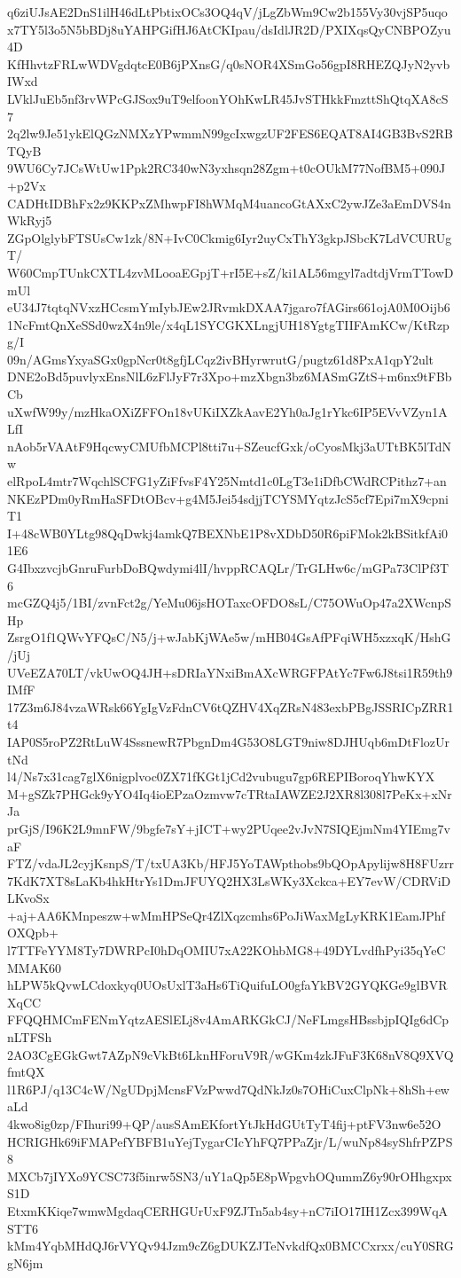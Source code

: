q6ziUJsAE2DnS1ilH46dLtPbtixOCs3OQ4qV/jLgZbWm9Cw2b155Vy30vjSP5uqo
x7TY5l3o5N5bBDj8uYAHPGifHJ6AtCKIpau/dsIdlJR2D/PXIXqsQyCNBPOZyu4D
KfHhvtzFRLwWDVgdqtcE0B6jPXnsG/q0sNOR4XSmGo56gpI8RHEZQJyN2yvbIWxd
LVklJuEb5nf3rvWPcGJSox9uT9elfoonYOhKwLR45JvSTHkkFmzttShQtqXA8cS7
2q2lw9Je51ykElQGzNMXzYPwmmN99gcIxwgzUF2FES6EQAT8AI4GB3BvS2RBTQyB
9WU6Cy7JCsWtUw1Ppk2RC340wN3yxhsqn28Zgm+t0cOUkM77NofBM5+090J+p2Vx
CADHtIDBhFx2z9KKPxZMhwpFI8hWMqM4uancoGtAXxC2ywJZe3aEmDVS4nWkRyj5
ZGpOlglybFTSUsCw1zk/8N+IvC0Ckmig6Iyr2uyCxThY3gkpJSbcK7LdVCURUgT/
W60CmpTUnkCXTL4zvMLooaEGpjT+rI5E+sZ/ki1AL56mgyl7adtdjVrmTTowDmUl
eU34J7tqtqNVxzHCcsmYmIybJEw2JRvmkDXAA7jgaro7fAGirs661ojA0M0Oijb6
1NcFmtQnXeSSd0wzX4n9le/x4qL1SYCGKXLngjUH18YgtgTIIFAmKCw/KtRzpg/I
09n/AGmsYxyaSGx0gpNcr0t8gfjLCqz2ivBHyrwrutG/pugtz61d8PxA1qpY2ult
DNE2oBd5puvlyxEnsNlL6zFlJyF7r3Xpo+mzXbgn3bz6MASmGZtS+m6nx9tFBbCb
uXwfW99y/mzHkaOXiZFFOn18vUKiIXZkAavE2Yh0aJg1rYkc6IP5EVvVZyn1ALfI
nAob5rVAAtF9HqcwyCMUfbMCPl8tti7u+SZeucfGxk/oCyosMkj3aUTtBK5lTdNw
elRpoL4mtr7WqchlSCFG1yZiFfvsF4Y25Nmtd1c0LgT3e1iDfbCWdRCPithz7+an
NKEzPDm0yRmHaSFDtOBcv+g4M5Jei54sdjjTCYSMYqtzJcS5cf7Epi7mX9cpniT1
I+48cWB0YLtg98QqDwkj4amkQ7BEXNbE1P8vXDbD50R6piFMok2kBSitkfAi01E6
G4IbxzvcjbGnruFurbDoBQwdymi4lI/hvppRCAQLr/TrGLHw6c/mGPa73ClPf3T6
mcGZQ4j5/1BI/zvnFct2g/YeMu06jsHOTaxcOFDO8sL/C75OWuOp47a2XWcnpSHp
ZsrgO1f1QWvYFQsC/N5/j+wJabKjWAe5w/mHB04GsAfPFqiWH5xzxqK/HshG/jUj
UVeEZA70LT/vkUwOQ4JH+sDRIaYNxiBmAXcWRGFPAtYc7Fw6J8tsi1R59th9IMfF
17Z3m6J84vzaWRsk66YgIgVzFdnCV6tQZHV4XqZRsN483exbPBgJSSRICpZRR1t4
IAP0S5roPZ2RtLuW4SssnewR7PbgnDm4G53O8LGT9niw8DJHUqb6mDtFlozUrtNd
l4/Ns7x31cag7glX6nigplvoc0ZX71fKGt1jCd2vubugu7gp6REPIBoroqYhwKYX
M+gSZk7PHGck9yYO4Iq4ioEPzaOzmvw7cTRtaIAWZE2J2XR8l308l7PeKx+xNrJa
prGjS/I96K2L9mnFW/9bgfe7sY+jICT+wy2PUqee2vJvN7SIQEjmNm4YIEmg7vaF
FTZ/vdaJL2cyjKsnpS/T/txUA3Kb/HFJ5YoTAWpthobs9bQOpApylijw8H8FUzrr
7KdK7XT8sLaKb4hkHtrYs1DmJFUYQ2HX3LsWKy3Xckca+EY7evW/CDRViDLKvoSx
+aj+AA6KMnpeszw+wMmHPSeQr4ZlXqzcmhs6PoJiWaxMgLyKRK1EamJPhfOXQpb+
l7TTFeYYM8Ty7DWRPcI0hDqOMIU7xA22KOhbMG8+49DYLvdfhPyi35qYeCMMAK60
hLPW5kQvwLCdoxkyq0UOsUxlT3aHs6TiQuifuLO0gfaYkBV2GYQKGe9glBVRXqCC
FFQQHMCmFENmYqtzAESlELj8v4AmARKGkCJ/NeFLmgsHBssbjpIQIg6dCpnLTFSh
2AO3CgEGkGwt7AZpN9cVkBt6LknHForuV9R/wGKm4zkJFuF3K68nV8Q9XVQfmtQX
l1R6PJ/q13C4cW/NgUDpjMcnsFVzPwwd7QdNkJz0s7OHiCuxClpNk+8hSh+ewaLd
4kwo8ig0zp/FIhuri99+QP/ausSAmEKfortYtJkHdGUtTyT4fij+ptFV3nw6e52O
HCRIGHk69iFMAPefYBFB1uYejTygarCIcYhFQ7PPaZjr/L/wuNp84syShfrPZPS8
MXCb7jIYXo9YCSC73f5inrw5SN3/uY1aQp5E8pWpgvhOQummZ6y90rOHhgxpxS1D
EtxmKKiqe7wmwMgdaqCERHGUrUxF9ZJTn5ab4sy+nC7iIO17IH1Zcx399WqASTT6
kMm4YqbMHdQJ6rVYQv94Jzm9cZ6gDUKZJTeNvkdfQx0BMCCxrxx/cuY0SRGgN6jm
